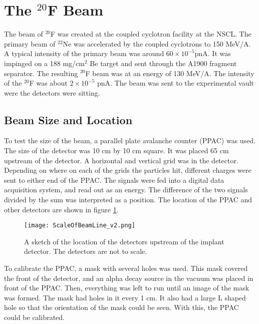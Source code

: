 \documentclass[../MaxHughesThesis.tex]{subfiles}
\begin{document}
\section{The $^{20}$F Beam}

The beam of $^{20}$F was created at the coupled cyclotron facility at the NSCL.
The primary beam of $^{22}$Ne was accelerated by the coupled cyclotrons to 150 MeV/A. 
A typical intensity of the primary beam was around $60 \times 10^{-5}$pnA.
It was impinged on a 188 mg/cm$^{2}$ Be target and sent through the A1900 fragment separator. 
The resulting $^{20}$F beam was at an energy of 130 MeV/A. 
The intensity of the $^{20}$F was about $2 \times 10^{-5}$ pnA.
The beam was sent to the experimental vault were the detectors were sitting.

\subsection{Beam Size and Location}
To test the size of the beam, a parallel plate avalanche counter (PPAC) was used.
The size of the detector was 10 cm by 10 cm square. 
It was placed 65 cm upstream of the detector.
A horizontal and vertical grid was in the detector.
Depending on where on each of the grids the particles hit, different charges were sent to either end of the PPAC.
The signals were fed into a digital data acquisition system, and read out as an energy.
The difference of the two signals divided by the sum was interpreted as a position.
The location of the PPAC and other detectors are shown in figure \ref{fig:BeamSetUp}.

\begin{figure}
	\centerline{\texttt{[image: ScaleOfBeamLine\_v2.png]}}
	\caption{A sketch of the location of the detectors upstream of the implant detector.
		    The detectors are not to scale. 
			}
	\label{fig:BeamSetUp}
\end{figure}  

To calibrate the PPAC, a mask with several holes was used. 
This mask covered the front of the detector, and an alpha decay source in the vacuum was placed in front of the PPAC.
Then, everything was left to run until an image of the mask was formed.
The mask had holes in it every 1 cm. 
It also had a large L shaped hole so that the orientation of the mask could be seen. 
With this, the PPAC could be calibrated.
\end{document}
